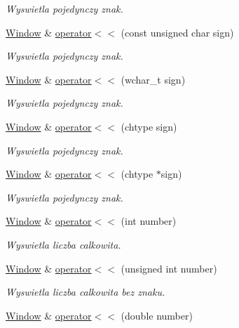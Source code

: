 \begin{DoxyCompactItemize}
\begin{DoxyCompactList}\small\item\em Wyswietla pojedynczy znak. \end{DoxyCompactList}\item 
\hyperlink{class_window}{Window} \& \hyperlink{class_window_a34c29e6bf9c6a26a9bf3e0b72580a56f}{operator$<$$<$} (const unsigned char sign)
\begin{DoxyCompactList}\small\item\em Wyswietla pojedynczy znak. \end{DoxyCompactList}\item 
\hyperlink{class_window}{Window} \& \hyperlink{class_window_a2577daac6833ba6aa6693c0ba3cd6b60}{operator$<$$<$} (wchar\+\_\+t sign)
\begin{DoxyCompactList}\small\item\em Wyswietla pojedynczy znak. \end{DoxyCompactList}\item 
\hyperlink{class_window}{Window} \& \hyperlink{class_window_a476ccb66073a36fead82735edf14667c}{operator$<$$<$} (chtype sign)
\begin{DoxyCompactList}\small\item\em Wyswietla pojedynczy znak. \end{DoxyCompactList}\item 
\hyperlink{class_window}{Window} \& \hyperlink{class_window_ac2dc5c37f9456fc8b75013cec9df19bf}{operator$<$$<$} (chtype $\ast$sign)
\begin{DoxyCompactList}\small\item\em Wyswietla pojedynczy znak. \end{DoxyCompactList}\item 
\hyperlink{class_window}{Window} \& \hyperlink{class_window_addc6a1cbce0c54b2e0c730b131181b1e}{operator$<$$<$} (int number)
\begin{DoxyCompactList}\small\item\em Wyswietla liczba calkowita. \end{DoxyCompactList}\item 
\hyperlink{class_window}{Window} \& \hyperlink{class_window_ab1398fdf47e455c69f5886ec40b5429c}{operator$<$$<$} (unsigned int number)
\begin{DoxyCompactList}\small\item\em Wyswietla liczba calkowita bez znaku. \end{DoxyCompactList}\item 
\hyperlink{class_window}{Window} \& \hyperlink{class_window_a2c75d176a50fa848d13997e14d832b50}{operator$<$$<$} (double number)

\end{DoxyCompactItemize}
